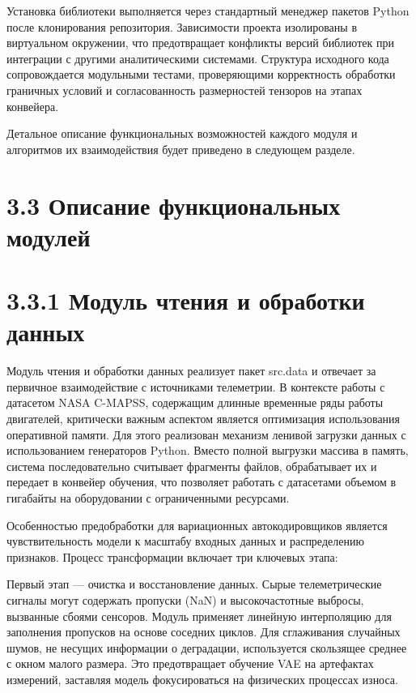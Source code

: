 \documentclass[14pt, a4paper, oneside]{extreport}
\begin{document}
Установка библиотеки выполняется через стандартный менеджер пакетов Python после клонирования репозитория. Зависимости проекта изолированы в виртуальном окружении, что предотвращает конфликты версий библиотек при интеграции с другими аналитическими системами. Структура исходного кода сопровождается модульными тестами, проверяющими корректность обработки граничных условий и согласованность размерностей тензоров на этапах конвейера.

Детальное описание функциональных возможностей каждого модуля и алгоритмов их взаимодействия будет приведено в следующем разделе.


\vspace{1em}
\section{3.3 Описание функциональных модулей}
\section{3.3.1 Модуль чтения и обработки данных}
\vspace{1em}

Модуль чтения и обработки данных реализует пакет src.data и отвечает за первичное взаимодействие с источниками телеметрии. В контексте работы с датасетом NASA C-MAPSS, содержащим длинные временные ряды работы двигателей, критически важным аспектом является оптимизация использования оперативной памяти. Для этого реализован механизм ленивой загрузки данных с использованием генераторов Python. Вместо полной выгрузки массива в память, система последовательно считывает фрагменты файлов, обрабатывает их и передает в конвейер обучения, что позволяет работать с датасетами объемом в гигабайты на оборудовании с ограниченными ресурсами.

Особенностью предобработки для вариационных автокодировщиков является чувствительность модели к масштабу входных данных и распределению признаков. Процесс трансформации включает три ключевых этапа:

Первый этап — очистка и восстановление данных. Сырые телеметрические сигналы могут содержать пропуски (NaN) и высокочастотные выбросы, вызванные сбоями сенсоров. Модуль применяет линейную интерполяцию для заполнения пропусков на основе соседних циклов. Для сглаживания случайных шумов, не несущих информации о деградации, используется скользящее среднее с окном малого размера. Это предотвращает обучение VAE на артефактах измерений, заставляя модель фокусироваться на физических процессах износа.
\end{document}
